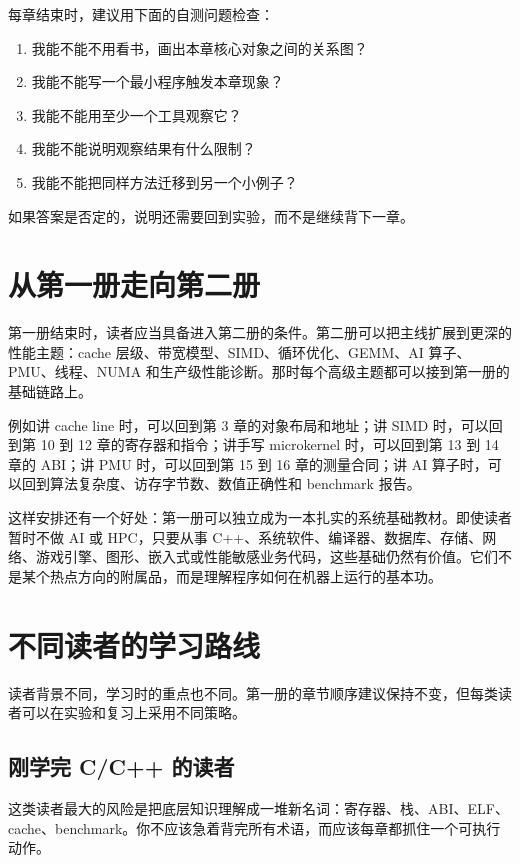 每章结束时，建议用下面的自测问题检查：

\begin{enumerate}
  \item 我能不能不用看书，画出本章核心对象之间的关系图？
  \item 我能不能写一个最小程序触发本章现象？
  \item 我能不能用至少一个工具观察它？
  \item 我能不能说明观察结果有什么限制？
  \item 我能不能把同样方法迁移到另一个小例子？
\end{enumerate}

如果答案是否定的，说明还需要回到实验，而不是继续背下一章。

\section{从第一册走向第二册}

第一册结束时，读者应当具备进入第二册的条件。第二册可以把主线扩展到更深的性能主题：cache 层级、带宽模型、SIMD、循环优化、GEMM、AI 算子、PMU、线程、NUMA 和生产级性能诊断。那时每个高级主题都可以接到第一册的基础链路上。

例如讲 cache line 时，可以回到第 3 章的对象布局和地址；讲 SIMD 时，可以回到第 10 到 12 章的寄存器和指令；讲手写 microkernel 时，可以回到第 13 到 14 章的 ABI；讲 PMU 时，可以回到第 15 到 16 章的测量合同；讲 AI 算子时，可以回到算法复杂度、访存字节数、数值正确性和 benchmark 报告。

这样安排还有一个好处：第一册可以独立成为一本扎实的系统基础教材。即使读者暂时不做 AI 或 HPC，只要从事 C++、系统软件、编译器、数据库、存储、网络、游戏引擎、图形、嵌入式或性能敏感业务代码，这些基础仍然有价值。它们不是某个热点方向的附属品，而是理解程序如何在机器上运行的基本功。

\section{不同读者的学习路线}

读者背景不同，学习时的重点也不同。第一册的章节顺序建议保持不变，但每类读者可以在实验和复习上采用不同策略。

\subsection{刚学完 C/C++ 的读者}

这类读者最大的风险是把底层知识理解成一堆新名词：寄存器、栈、ABI、ELF、cache、benchmark。你不应该急着背完所有术语，而应该每章都抓住一个可执行动作。


